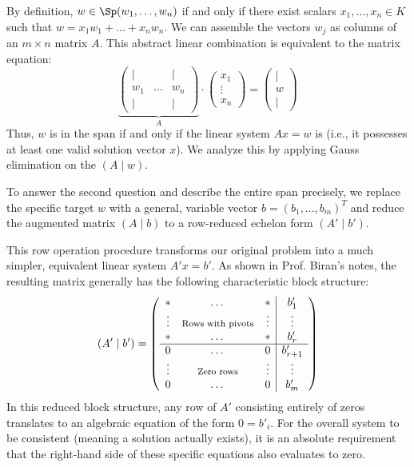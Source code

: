 \begin{answer}
By definition, $w \in \Sp(w_{1}, \dots, w_{n})$ if and only if there exist scalars $x_{1}, \dots, x_{n} \in K$ such that $w = x_{1} w_{1} + \dots + x_{n} w_{n}$. We can assemble the vectors $w_{j}$ as columns of an $m \times n$ matrix $A$. This abstract linear combination is equivalent to the matrix equation:
\[
\underbrace{\begin{pmatrix} | & & | \\ w_{1} & \dots & w_{n} \\ | & & | \end{pmatrix}}_{A} \cdot \begin{pmatrix} x_{1} \\ \vdots \\ x_{n} \end{pmatrix} = \begin{pmatrix} | \\ w \\ | \end{pmatrix}
\]
Thus, $w$ is in the span if and only if the linear system $Ax = w$ is  (i.e., it possesses at least one valid solution vector $x$). We analyze this by applying Gauss elimination on the  $(A \mid w)$. 

To answer the second question and describe the entire span precisely, we replace the specific target $w$ with a general, variable vector $b = (b_{1}, \dots, b_{m})^{T}$ and reduce the augmented matrix $(A \mid b)$ to a row-reduced echelon form $(A' \mid b')$. 

This row operation procedure transforms our original problem into a much simpler, equivalent linear system $A'x = b'$. As shown in Prof. Biran's notes, the resulting matrix generally has the following characteristic block structure:
\begin{equation}
\label{eq:block_consistency}
(A' \mid b') = \left( 
\begin{array}{ccc|c}
* & \dots & * & b'_{1} \\
\vdots & \text{\footnotesize Rows with pivots} & \vdots & \vdots \\
* & \dots & * & b'_{r} \\ \hline
0 & \dots & 0 & b'_{r+1} \\
\vdots & \text{\footnotesize Zero rows} & \vdots & \vdots \\
0 & \dots & 0 & b'_{m}
\end{array} 
\right)
\end{equation}
In this reduced block structure, any row of $A'$ consisting entirely of zeros translates to an algebraic equation of the form $0 = b'_{i}$. For the overall system to be consistent (meaning a solution actually exists), it is an absolute requirement that the right-hand side of these specific equations also evaluates to zero. 


\end{answer}
